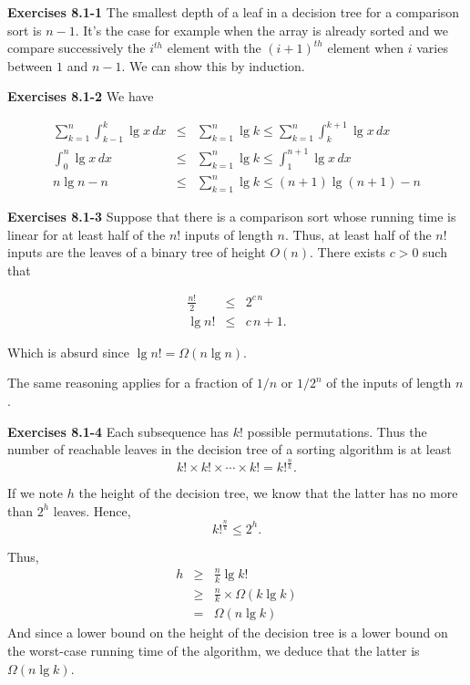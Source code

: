 \documentclass[a4paper,12pt]{article}
\newcommand{\newpar}[1]
{\bigskip \noindent \textbf{Exercises #1} \newline}
\begin{document}
\newpar{8.1-1} The smallest depth of a leaf in a decision tree for a
comparison sort is $n-1$.  It's the case for example when the array is
already sorted and we compare successively the $i^{th}$ element with
the $(i+1)^{th}$ element when $i$ varies between $1$ and $n-1$.  We
can show this by induction.

\newpar{8.1-2} We have

\begin{eqnarray*}
  \sum_{k=1}^n \int_{k-1}^k \lg x\, dx &\le & \sum_{k=1}^n \lg k \le
  \sum_{k=1}^n \int_k^{k+1} \lg x\,dx \\
  \int_0^n \lg x\,dx &\le& \sum_{k=1}^n \lg k \le \int_1^{n+1}\lg
  x\, dx \\
  n\lg n - n &\le& \sum_{k=1}^n \lg k \le (n+1)\lg(n+1) - n
\end{eqnarray*}

\newpar{8.1-3}  Suppose that there is a comparison sort whose running
time is linear for at least half of the $n!$ inputs of length $n$.
Thus, at least half of the $n!$ inputs are the leaves of a binary tree
of height $O(n)$.  There exists $c > 0$ such that

\begin{eqnarray*}
  \frac{n!}{2} &\le& 2^{c\,n} \\
  \lg n! &\le& c\,n + 1.
\end{eqnarray*}

Which is absurd since $\lg n! = \Omega(n\lg n)$.

\medskip
The same reasoning applies for a fraction of $1/n$ or $1/2^n$ of the
inputs of length $n$.

\newpar{8.1-4} Each subsequence has $k$! possible permutations.  Thus
the number of reachable leaves in the decision tree of a sorting
algorithm is at least
\[ k! \times k! \times \cdots \times k! = {k!}^{\frac{n}{k}} .\]

If we note $h$ the height of the decision tree, we know that the
latter has no more than $2^h$ leaves.  Hence,
\[ {k!}^{\frac{n}{k}} \le 2^h.\]

Thus,
\begin{eqnarray*}
  h &\ge& \frac{n}{k} \lg k! \\
  &\ge& \frac{n}{k} \times \Omega(k \lg k) \\
  &=& \Omega(n \lg k)
\end{eqnarray*}
And since a lower bound on the height of the decision tree is a lower
bound on the worst-case running time of the algorithm, we deduce that
the latter is $\Omega(n \lg k)$.
\end{document}
